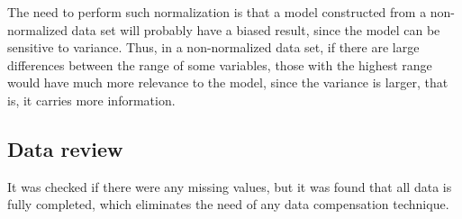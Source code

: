 \documentclass[conference]{IEEEtran}
\begin{document}
The need to perform such normalization is that a model constructed from a 
non-normalized data set will probably have a biased result, since the model can be 
sensitive to variance. Thus, in a non-normalized data set, if there are large 
differences between the range of some variables, those with the highest range would have much
more relevance to the model, since the variance is larger, that is, it carries more information.

\subsection{Data review}\label{AA}
It was checked if there were any missing values, but it was found that all data is fully completed, 
which eliminates the need of any data compensation technique.
\end{document}
